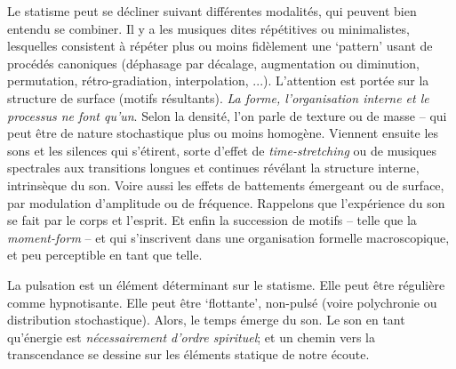 \documentclass{article}
\begin{document}
Le statisme peut se décliner suivant différentes modalités, qui peuvent bien entendu se combiner. Il y a les musiques dites répétitives ou minimalistes, lesquelles consistent à répéter plus ou moins fidèlement une `pattern' usant de procédés canoniques (déphasage par décalage, augmentation ou diminution, permutation, rétro-gradiation, interpolation, ...). L'attention est portée sur la structure de surface (motifs résultants). \textit{La  forme, l'organisation interne et le processus ne font qu'un}. Selon la densité, l'on parle de texture ou de masse -- qui peut être de nature stochastique plus ou moins homogène. Viennent ensuite les sons et les silences qui s'étirent, sorte d'effet de \textit{time-stretching} ou de musiques spectrales aux transitions longues et continues révélant la structure interne, intrinsèque du son. Voire aussi les effets de battements émergeant ou de surface, par modulation d'amplitude ou de fréquence. Rappelons que l'expérience du son se fait par le corps et l'esprit. Et enfin la succession de motifs -- telle que la \textit{moment-form} -- et qui s'inscrivent dans une organisation formelle macroscopique, et peu perceptible en tant que telle.










La pulsation est un élément déterminant sur le statisme. Elle peut être régulière comme hypnotisante. Elle peut être `flottante', non-pulsé (voire polychronie ou distribution stochastique). Alors, le temps émerge du son. Le son en tant qu'énergie est \textit{nécessairement d’ordre spirituel}; et un chemin vers la transcendance se dessine sur les éléments statique de notre écoute.
\end{document}
